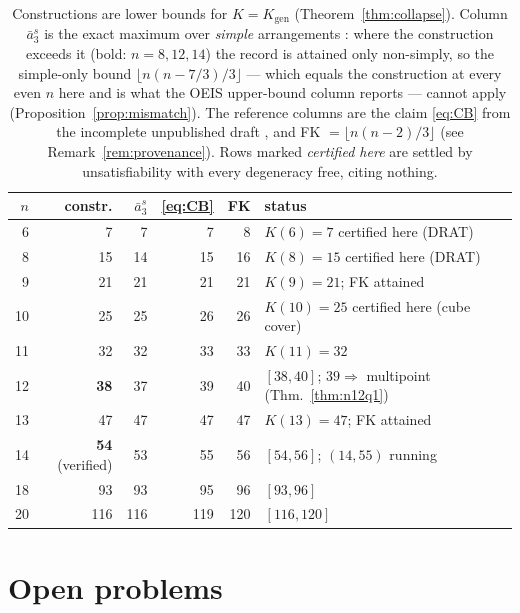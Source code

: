 \documentclass[11pt]{article}
\theoremstyle{definition}
\newcommand{\Kgen}{K_{\mathrm{gen}}}
\begin{document}
\begin{table}[t]
\centering
\begin{tabular}{rrrrrl}
\toprule
$n$ & constr. & $\bar a_3^s$ & \eqref{eq:CB} & FK & status\\
\midrule
6 & 7 & 7 & 7 & 8 & $K(6)=7$ certified here (DRAT)\\
8 & 15 & 14 & 15 & 16 & $K(8)=15$ certified here (DRAT)\\
9 & 21 & 21 & 21 & 21 & $K(9)=21$; FK attained\\
10 & 25 & 25 & 26 & 26 & $K(10)=25$ certified here (cube cover)\\
11 & 32 & 32 & 33 & 33 & $K(11)=32$ \cite{Savchuk}\\
12 & \textbf{38} & 37 & 39 & 40 & $[38,40]$; $39\Rightarrow$ multipoint (Thm.~\ref{thm:n12q1})\\
13 & 47 & 47 & 47 & 47 & $K(13)=47$; FK attained\\
14 & \textbf{54} (verified) & 53 & 55 & 56 & $[54,56]$; $(14,55)$ running\\
18 & 93 & 93 & 95 & 96 & $[93,96]$\\
20 & 116 & 116 & 119 & 120 & $[116,120]$\\
\bottomrule
\end{tabular}
\caption{Constructions are lower bounds for $K=\Kgen$
(Theorem~\ref{thm:collapse}). Column $\bar a_3^s$ is the exact maximum over
\emph{simple} arrangements \cite{BBL,Blanc}: where the construction exceeds
it (bold: $n=8,12,14$) the record is attained only non-simply, so the
simple-only bound $\lfloor n(n-7/3)/3\rfloor$ --- which equals the
construction at every even $n$ here and is what the OEIS upper-bound column
reports --- cannot apply (Proposition~\ref{prop:mismatch}). The reference
columns are the claim \eqref{eq:CB} from the incomplete unpublished draft
\cite{CB2007}, and FK $=\lfloor n(n-2)/3\rfloor$ \cite{FK1999} (see
Remark~\ref{rem:provenance}). Rows marked \emph{certified here} are settled
by unsatisfiability with every degeneracy free, citing nothing.}
\label{tab:windows}
\end{table}

\section{Open problems}
\end{document}
